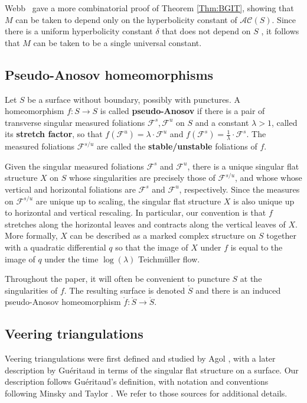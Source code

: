 \documentclass[11pt,letterpaper]{amsart}
\newcommand{\mc}{\mathcal}
\newcommand{\mr}{\mathring}
\numberwithin{equation}{section}
\theoremstyle{definition}
\newcommand{\define}[1]{\textbf{#1}}
\begin{document}
Webb~\cite{Webb:BGIT} gave a more combinatorial proof of Theorem \ref{Thm:BGIT}, showing that $M$ can be taken to depend only on the hyperbolicity constant of $\mathcal{AC}(S)$. Since there is a uniform hyperbolicity constant $\delta$ that does not depend on $S$ 
\cite{Aougab:UniformHyperbolicity, Bowditch:UniformHyperbolicity, CRS:UniformHyperbolicity, HPW:SlimUnicorns},
 it follows that $M$ can be taken to be a single universal constant. 

\subsection{Pseudo-Anosov homeomorphisms}\label{Sec:pA}
Let $S$ be a surface without boundary, possibly with punctures.
A homeomorphism $f \colon S \to S$ is called \define{pseudo-Anosov} if there is a pair of transverse singular measured foliations $\mc F^s, \mc F^u$ on $S$ and a constant $\lambda >1$, called its \define{stretch factor}, so that $f(\mc F^u) = \lambda \cdot \mc F^u$ and $f(\mc F^s) = \frac{1}{\lambda} \cdot \mc F^s$. The measured foliations $\mc F^{s/u}$ are called the \define{stable/unstable} foliations of $f$. 

Given the singular measured foliations $\mc F^s$ and $\mc F^u$, there is a unique singular flat structure $X$ on $S$ 
whose singularities are precisely those of $\mc F^{s/u}$, and whose whose vertical and horizontal foliations are $\mc F^s$ and $\mc F^u$, respectively. Since the measures on $\mc F^{s/u}$ are unique up to scaling, the singular flat structure $X$ is also unique up to horizontal and vertical rescaling.
In particular, our convention is that $f$ stretches along the horizontal leaves and contracts along the vertical leaves of $X$. More formally, $X$ can be described as a marked complex structure on $S$ together with a quadratic differential $q$ so that the image of $X$ under $f$ is equal to the image of $q$ under the time $\log(\lambda)$ Teichm\"uller flow. 

Throughout the paper, it will often be convenient to puncture $S$ at the singularities of $f$. The resulting surface is denoted $\mr S$ and there is an induced pseudo-Anosov homeomorphism $\mr f \colon \mr S \to \mr S$. 

\subsection{Veering triangulations}\label{Sec:Veering}

Veering triangulations were first defined and studied by Agol \cite{Agol:Veering}, with a later description by Gu\'eritaud \cite{Gueritaud:Veering} in terms of the singular flat structure on a surface. Our description follows Gu\'eritaud's definition, with notation and conventions following Minsky and Taylor \cite{MinskyTaylor:FiberedFaces, MinskyTaylor:SubsurfaceDist}. We refer to those sources for additional details.
\end{document}
